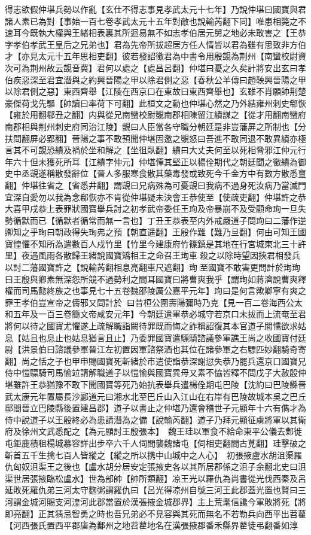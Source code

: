 得志欲假仲堪兵勢以作亂【玄仕不得志事見孝武太元十七年】乃說仲堪曰國寶與君諸人素已為對【事始一百七卷孝武太元十五年對敵也說輸芮翻下同】唯患相斃之不速耳今既執大權與王緒相表裏其所迴易無不如志孝伯居元舅之地必未敢害之【王恭字孝伯孝武王皇后之兄弟也】君為先帝所拔超居方任人情皆以君為雖有思致非方伯才【亦見太元十五年思相吏翻】彼若發詔徵君為中書令用殷覬為荆州【南蠻校尉資次可為荆州故云覬音冀】君何以處之【處昌呂翻】仲堪曰憂之久矣計將安出玄曰孝伯疾惡深至君宜潛與之約興晉陽之甲以除君側之惡【春秋公羊傳曰趙鞅興晉陽之甲以除君側之惡】東西齊舉【江陵在西京口在東故曰東西齊舉也】玄雖不肖願帥荆楚豪傑荷戈先驅【帥讀曰率荷下可翻】此桓文之勳也仲堪心然之乃外結雍州刺史郗恢【雍於用翻郗丑之翻】内與從兄南蠻校尉覬南郡相陳留江績謀之【從才用翻南蠻府南郡相與荆州刺史府同治江陵】覬曰人臣當各守職分朝廷是非豈藩屏之所制也【分扶問翻屏必郢翻】晉陽之事不敢預聞仲堪固邀之覬怒曰吾進不敢同退不敢異績亦極言其不可覬恐績及禍於坐和解之【坐徂臥翻】績曰大丈夫何至以死相脅邪江仲元行年六十但未獲死所耳【江績字仲元】仲堪憚其堅正以楊佺期代之朝廷聞之徵績為御史中丞覬遂稱散發辭位【晉人多服寒食散其藥毒發或致死今千金方中有數方散悉亶翻】仲堪往省之【省悉井翻】謂覬曰兄病殊為可憂覬曰我病不過身死汝病乃當滅門宜深自愛勿以我為念郗恢亦不肯從仲堪疑未決會王恭使至【使疏吏翻】仲堪許之恭大喜甲戌恭上表罪狀國寶舉兵討之初孝武帝委任王珣及帝暴崩不及受顧命珣一旦失勢循默而已【循默者循常而無一言也】丁丑王恭表至内外戒嚴道子問珣曰二藩作逆卿知之乎珣曰朝政得失珣弗之預【朝直遥翻】王殷作難【難乃旦翻】何由可知王國寶惶懼不知所為遣數百人戍竹里【竹里今建康府竹篠鎮是其地在行宮城東北三十許里】夜遇風雨各散歸王緒說國寶矯相王之命召王珣車殺之以除時望因挾君相發兵以討二藩國寶許之【說輸芮翻相息亮翻車尺遮翻】珣至國寶不敢害更問計於珣珣曰王殷與卿素無深怨所競不過勢利之間耳國寶曰將曹爽我乎【謂珣如蔣濟說曹爽釋權而司馬懿終族之也事見七十五卷魏邵陵厲公嘉平元年】珣曰是何言歟卿寧有爽之罪王孝伯豈宣帝之儔邪又問計於曰昔桓公圍壽陽彌時乃克【見一百二卷海西公太和五年及一百三卷簡文帝咸安元年】今朝廷遣軍恭必城守若京口未拔而上流奄至君將何以待之國寶尤懼遂上疏解職詣闕待罪既而悔之詐稱詔復其本官道子闇懦欲求姑息【姑且也息止也姑息猶言且止】乃委罪國寶遣驃騎諮議參軍譙王尚之收國寶付廷尉【洪景伯曰諮議參軍晉江左初置因軍諮祭酒也其位在諸參軍之右驃匹妙翻騎奇寄翻】尚之恬之子也甲申賜國寶死斬緒於市遣使詣恭深謝愆失恭乃罷兵還京口國寶兄侍中愷驃騎司馬愉竝請解職道子以愷愉與國寶異母又素不恊皆釋不問戊子大赦殷仲堪雖許王恭猶豫不敢下聞國寶等死乃始抗表舉兵遣楊佺期屯巴陵【沈約曰巴陵縣晉武太康元年置屬長沙酈道元曰湘水北至巴丘山入江山在右岸有巴陵故城本吳之巴丘邸閤晉立巴陵縣後置建昌郡】道子以書止之仲堪乃還會稽世子元顯年十六有儁才為侍中說道子以王殷終必為患請潛為之備【說輸芮翻】道子乃拜元顯征虜將軍以其衛府及徐州文武悉配之【為元顯討王殷張本】　魏王珪以軍食不給命東平公儀去鄴徙屯鉅鹿積租楊城慕容詳出步卒六千人伺間襲魏諸屯【伺相吏翻間古莧翻】珪擊破之斬首五千生擒七百人皆縱之【縱之所以携中山城中之人心】　初張掖盧水胡沮渠羅仇匈奴沮渠王之後也【盧水胡分居安定張掖史各以其所居郡係之沮子余翻北史曰沮渠世居張掖臨松盧水】世為部帥【帥所類翻】凉王光以羅仇為尚書從光伐西秦及呂延敗死羅仇弟三河太守麴粥謂羅仇曰【呂光得凉州自號三河王此郡蓋光置也賢曰三河謂金城河賜支河湟河此郡當置於漢張掖金城郡界】主上荒耄信讒今軍敗將死【將即亮翻】正其猜忌智勇之時也吾兄弟必不見容與其死而無名不若勒兵向西平出苕藋【河西張氏置西平郡唐為鄯州之地苕藋地名在漢張掖郡番禾縣界藋徒弔翻番如淳